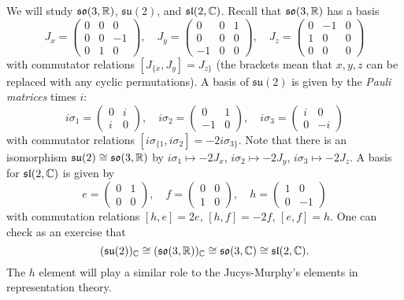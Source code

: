 \begin{example}
  We will study
  $\mathfrak{so}(3, \mathbb{R})$,
  $\mathfrak{su}(2)$, and
  $\mathfrak{sl}(2, \mathbb{C})$.
  Recall that $\mathfrak{so}(3, \mathbb{R})$
  has a basis
  \[
    J_x = \begin{pmatrix}
      0 & 0 & 0 \\
      0 & 0 & -1 \\
      0 & 1 & 0
    \end{pmatrix}, \quad
    J_y = \begin{pmatrix}
      0 & 0 & 1 \\
      0 & 0 & 0 \\
      -1 & 0 & 0
    \end{pmatrix}, \quad
    J_z = \begin{pmatrix}
      0 & -1 & 0 \\
      1 & 0 & 0 \\
      0 & 0 & 0
    \end{pmatrix}
  \]
  with commutator relations
  $[J_{\{ x}, J_y] = J_{z\}}$ (the brackets
  mean that $x, y, z$ can be replaced
  with any cyclic permutations).
  A basis of $\mathfrak{su}(2)$ is
  given by the \emph{Pauli matrices}
  times $i$:
  \[
    i \sigma_1 =
    \begin{pmatrix}
      0 & i \\
      i & 0
    \end{pmatrix}, \quad
    i \sigma_2 =
    \begin{pmatrix}
      0 & 1 \\
      -1 & 0
    \end{pmatrix}, \quad
    i \sigma_3 =
    \begin{pmatrix}
      i & 0 \\
      0 & -i
    \end{pmatrix}
  \]
  with commutator relations
  $[i \sigma_{\{ 1}, i \sigma_2] = -2 i \sigma_{3\}}$.
  Note that there is an isomorphism
  $\mathfrak{su}(2) \cong \mathfrak{so}(3, \mathbb{R})$
  by $i \sigma_1 \mapsto -2 J_x$,
  $i \sigma_2 \mapsto -2 J_y$,
  $i \sigma_3 \mapsto -2 J_z$.
  A basis for $\mathfrak{sl}(2, \mathbb{C})$
  is given by
  \[
    e = \begin{pmatrix}
      0 & 1 \\
      0 & 0
    \end{pmatrix}, \quad
    f = \begin{pmatrix}
      0 & 0 \\
      1 & 0
    \end{pmatrix}, \quad
    h = \begin{pmatrix}
      1 & 0 \\
      0 & -1
    \end{pmatrix}
  \]
  with commutation relations
  $[h, e] = 2e$, $[h, f] = -2f$,
  $[e, f] = h$.
  One can check as an exercise that
  \[(\mathfrak{su}(2))_{\mathbb{C}} \cong (\mathfrak{so}(3, \mathbb{R}))_{\mathbb{C}} \cong \mathfrak{so}(3, \mathbb{C}) \cong \mathfrak{sl}(2, \mathbb{C}).\]
  The $h$  element will play a similar
  role to the Jucys-Murphy's elements
  in representation theory.
\end{example}

